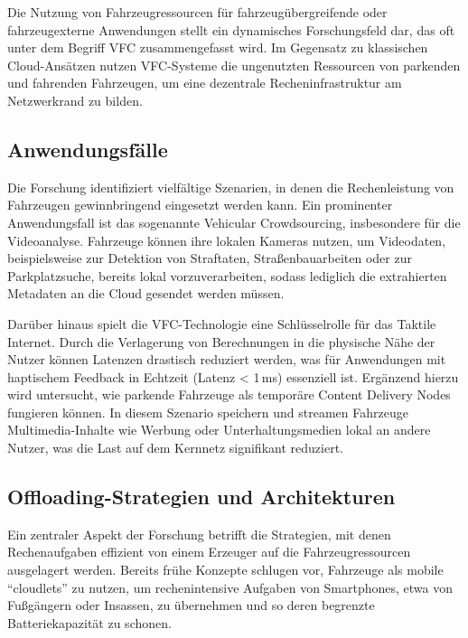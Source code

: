 Die Nutzung von Fahrzeugressourcen für fahrzeugübergreifende oder fahrzeugexterne Anwendungen stellt ein dynamisches Forschungsfeld dar, das oft unter dem Begriff \gls{VFC} zusammengefasst wird. Im Gegensatz zu klassischen Cloud-Ansätzen nutzen VFC-Systeme die ungenutzten Ressourcen von parkenden und fahrenden Fahrzeugen, um eine dezentrale Recheninfrastruktur am Netzwerkrand zu bilden.

\subsection{Anwendungsfälle}

Die Forschung identifiziert vielfältige Szenarien, in denen die Rechenleistung von Fahrzeugen gewinnbringend eingesetzt werden kann. Ein prominenter Anwendungsfall ist das sogenannte Vehicular Crowdsourcing, insbesondere für die Videoanalyse. Fahrzeuge können ihre lokalen Kameras nutzen, um Videodaten, beispielsweise zur Detektion von Straftaten, Straßenbauarbeiten oder zur Parkplatzsuche, bereits lokal vorzuverarbeiten, sodass lediglich die extrahierten Metadaten an die Cloud gesendet werden müssen. \cite{Zhu2018}

Darüber hinaus spielt die \gls{VFC}-Technologie eine Schlüsselrolle für das Taktile Internet. Durch die Verlagerung von Berechnungen in die physische Nähe der Nutzer können Latenzen drastisch reduziert werden, was für Anwendungen mit haptischem Feedback in Echtzeit (Latenz < 1\,ms) essenziell ist. Ergänzend hierzu wird untersucht, wie parkende Fahrzeuge als temporäre Content Delivery Nodes fungieren können. In diesem Szenario speichern und streamen Fahrzeuge Multimedia-Inhalte wie Werbung oder Unterhaltungsmedien lokal an andere Nutzer, was die Last auf dem Kernnetz signifikant reduziert. \cite{Kharel2019} \cite{Malandrino2014}

\subsection{Offloading-Strategien und Architekturen}

Ein zentraler Aspekt der Forschung betrifft die Strategien, mit denen Rechenaufgaben effizient von einem Erzeuger auf die Fahrzeugressourcen ausgelagert werden. Bereits frühe Konzepte schlugen vor, Fahrzeuge als mobile \enquote{cloudlets} zu nutzen, um rechenintensive Aufgaben von Smartphones, etwa von Fußgängern oder Insassen, zu übernehmen und so deren begrenzte Batteriekapazität zu schonen. \cite{Zhang2015}

